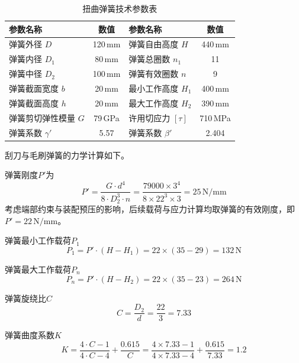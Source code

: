 \begin{table}[htbp]
    \centering
    \caption{扭曲弹簧技术参数表}
    \label{tab:spring_params_rebounce}
    \renewcommand{\arraystretch}{1.3} %
    \begin{tabularx}{\textwidth}{XcXc} %
        \toprule %
        \textbf{参数名称} & \textbf{数值} & \textbf{参数名称} & \textbf{数值} \\
        \midrule %
        弹簧外径 $D$ & 120\,mm & 弹簧自由高度 $H$ & 440\,mm \\
        弹簧内径 $D_1$ & 80\,mm & 弹簧总圈数 $n_1$ & 11 \\
        弹簧中径 $D_2$ & 100\,mm & 弹簧有效圈数 $n$ & 9 \\
        弹簧截面宽度 $b$ & 20\,mm & 最小工作高度 $H_1$ & 400\,mm \\
        弹簧截面高度 $h$ & 20\,mm & 最大工作高度 $H_2$ & 390\,mm \\
        弹簧剪切弹性模量 $G$ & 79\,GPa & 许用切应力 $[\tau]$ & 710\,MPa \\
        弹簧系数 $\gamma'$ & 5.57 & 弹簧系数 $\beta'$ & 2.404 \\
        \bottomrule %
    \end{tabularx}
\end{table}

刮刀与毛刷弹簧的力学计算如下。


弹簧刚度$P'$为
\begin{equation}
    P' = \frac{G \cdot d^4}{8 \cdot D_2^3 \cdot n} = \frac{79000 \times 3^4}{8 \times 22^3 \times 3} = 25 \, \text{N/mm}
\end{equation}
考虑端部约束与装配预压的影响，后续载荷与应力计算均取弹簧的有效刚度，即 $P' = 22 \, \text{N/mm}$。

弹簧最小工作载荷$P_1$
\begin{equation}
    P_1 = P' \cdot (H - H_1) = 22 \times (35 - 29) = 132 \, \text{N}
\end{equation}

弹簧最大工作载荷$P_n$
\begin{equation}
    P_n = P' \cdot (H - H_2) = 22 \times (35 - 23) = 264 \, \text{N}
\end{equation}

弹簧旋绕比$C$
\begin{equation}
    C = \frac{D_2}{d} = \frac{22}{3} = 7.33
\end{equation}

弹簧曲度系数$K$
\begin{equation}
    K = \frac{4 \cdot C - 1}{4 \cdot C - 4} + \frac{0.615}{C} = \frac{4 \times 7.33 - 1}{4 \times 7.33 - 4} + \frac{0.615}{7.33} = 1.2
\end{equation}

